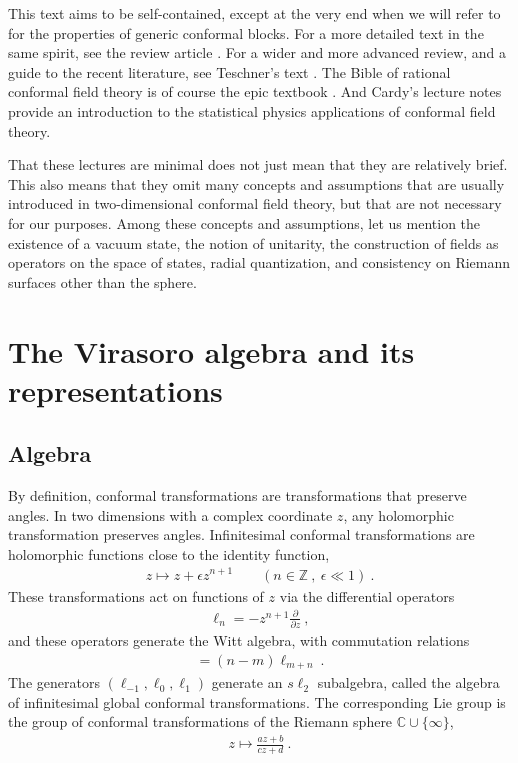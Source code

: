 \documentclass[12pt, a4paper]{article}
\theoremstyle{break}
\begin{document}
This text  aims to be self-contained, except at the very end when we will refer to \cite{zz90} for the properties of generic conformal blocks.
For a more detailed text in the same spirit, see the review article \cite{rib14}. For a wider and more advanced review, and a guide to the recent literature, see Teschner's text \cite{tes17}. 
The Bible of rational conformal field theory is of course the epic textbook \cite{fms97}. And Cardy's lecture notes \cite{car08} provide an introduction to the statistical physics applications of conformal field theory.

That these lectures are minimal does not just mean that they are relatively brief. This also means that they omit many concepts and assumptions that are usually introduced in two-dimensional conformal field theory, but that are not necessary for our purposes. Among these concepts and assumptions, let us mention the existence of a vacuum state, the notion of unitarity, the construction of fields as operators on the space of states, radial quantization, and consistency on Riemann surfaces other than the sphere.

\section{The Virasoro algebra and its representations}

\subsection{Algebra}

By definition, conformal transformations are transformations that preserve angles. 
In two dimensions with a complex coordinate $z$, any holomorphic transformation preserves angles.
Infinitesimal conformal transformations are holomorphic functions close to the identity function, 
\begin{align}
 z \mapsto z + \epsilon z^{n+1}\qquad (n\in\mathbb{Z}\ , \ \epsilon\ll 1) \ .
\end{align}
These transformations act on functions of $z$ via the differential operators 
\begin{align}
 \ell_n = -z^{n+1}\frac{\partial}{\partial z}\ ,
\end{align}
and these operators generate the Witt algebra, with commutation relations
\begin{align}
 [\ell_n,\ell_m ] = (n-m)\ell_{m+n}\ .
\end{align}
The generators $(\ell_{-1},\ell_0,\ell_1)$ generate an $s\ell_2$ subalgebra, called the algebra of infinitesimal global conformal transformations.  The corresponding Lie group is the group of conformal transformations of 
the Riemann sphere $\mathbb{C}\cup \{\infty\}$,
\begin{align}
 z \mapsto \frac{az+b}{cz+d}\ .
\end{align}
\end{document}
